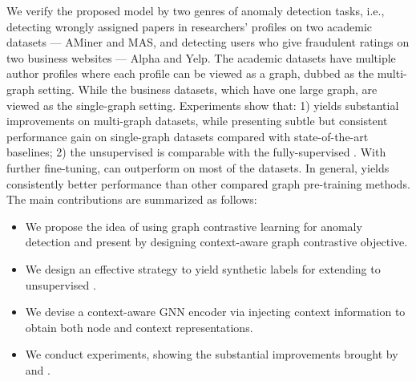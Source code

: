 We verify the proposed model by two genres of anomaly detection tasks, i.e., detecting wrongly assigned papers in researchers' profiles on two academic datasets --- AMiner and MAS, and detecting users who give fraudulent ratings on two business websites --- Alpha and Yelp. The academic datasets have multiple author profiles where each profile can be viewed as a graph, dubbed as the multi-graph setting. While the business datasets, which have one large graph, are viewed as the single-graph setting.
Experiments show that: 1) \smodel yields substantial improvements on multi-graph datasets, while presenting subtle but consistent performance gain on single-graph datasets compared with state-of-the-art baselines;
2) the unsupervised  \spmodel is comparable with the fully-supervised \model. With further fine-tuning, \spmodel can outperform \smodel on most of the datasets. 
In general, \spmodel yields consistently better performance than other compared graph pre-training methods. The main contributions are summarized as follows:

\begin{itemize}[leftmargin=*]
	
	\item We propose the idea of using graph contrastive learning for anomaly detection and present \smodel by designing context-aware graph contrastive objective. 

	\item We design an effective strategy to yield synthetic labels for extending \smodel to unsupervised \pmodel. 

	\item We devise a context-aware GNN encoder via injecting context information to obtain both node and context representations.
	
	\item We conduct experiments, showing the substantial improvements brought by \smodel and \pmodel. 

\end{itemize}




 





















